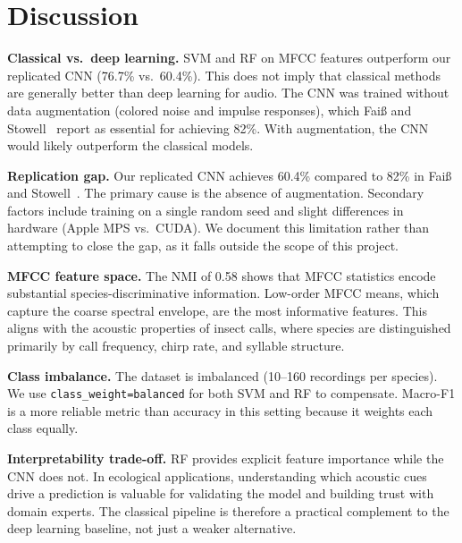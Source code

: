 
\section{Discussion}\label{sec:discussion}

\textbf{Classical vs.\ deep learning.}
SVM and RF on MFCC features outperform our replicated CNN (76.7\% vs.\ 60.4\%).
This does not imply that classical methods are generally better than deep learning for audio.
The CNN was trained without data augmentation (colored noise and impulse responses), which Fai\ss{} and Stowell~\cite{faiss2023adaptive} report as essential for achieving 82\%.
With augmentation, the CNN would likely outperform the classical models.

\textbf{Replication gap.}
Our replicated CNN achieves 60.4\% compared to 82\% in Fai\ss{} and Stowell~\cite{faiss2023adaptive}.
The primary cause is the absence of augmentation.
Secondary factors include training on a single random seed and slight differences in hardware (Apple MPS vs.\ CUDA).
We document this limitation rather than attempting to close the gap, as it falls outside the scope of this project.

\textbf{MFCC feature space.}
The NMI of 0.58 shows that MFCC statistics encode substantial species-discriminative information.
Low-order MFCC means, which capture the coarse spectral envelope, are the most informative features.
This aligns with the acoustic properties of insect calls, where species are distinguished primarily by call frequency, chirp rate, and syllable structure.

\textbf{Class imbalance.}
The dataset is imbalanced (10--160 recordings per species).
We use \texttt{class\_weight=balanced} for both SVM and RF to compensate.
Macro-F1 is a more reliable metric than accuracy in this setting because it weights each class equally.

\textbf{Interpretability trade-off.}
RF provides explicit feature importance while the CNN does not.
In ecological applications, understanding which acoustic cues drive a prediction is valuable for validating the model and building trust with domain experts.
The classical pipeline is therefore a practical complement to the deep learning baseline, not just a weaker alternative.
